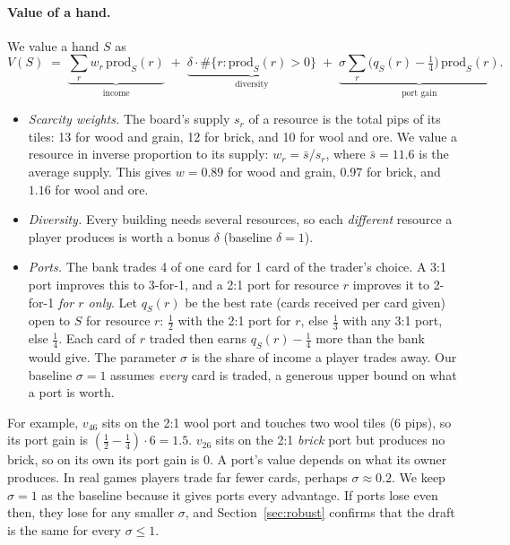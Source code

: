 \documentclass[11pt]{article}
\begin{document}
\paragraph{Value of a hand.} We value a hand $S$ as
\begin{equation}\label{eq:V}
V(S) \;=\; \underbrace{\sum_r w_r\,\mathrm{prod}_S(r)}_{\text{income}} \;+\; \underbrace{\delta\cdot\#\{r:\mathrm{prod}_S(r)>0\}}_{\text{diversity}} \;+\; \underbrace{\sigma\sum_r \big(q_S(r)-\tfrac14\big)\,\mathrm{prod}_S(r)}_{\text{port gain}} .
\end{equation}
\begin{itemize}
\item \emph{Scarcity weights.} The board's supply $s_r$ of a resource is the total pips of its tiles: 13 for wood and grain, 12 for brick, and 10 for wool and ore. We value a resource in inverse proportion to its supply: $w_r=\bar s/s_r$, where $\bar s=11.6$ is the average supply. This gives $w=0.89$ for wood and grain, $0.97$ for brick, and $1.16$ for wool and ore.
\item \emph{Diversity.} Every building needs several resources, so each \emph{different} resource a player produces is worth a bonus $\delta$ (baseline $\delta=1$).
\item \emph{Ports.} The bank trades 4 of one card for 1 card of the trader's choice. A 3:1 port improves this to 3-for-1, and a 2:1 port for resource $r$ improves it to 2-for-1 \emph{for $r$ only}. Let $q_S(r)$ be the best rate (cards received per card given) open to $S$ for resource $r$: $\tfrac12$ with the 2:1 port for $r$, else $\tfrac13$ with any 3:1 port, else $\tfrac14$. Each card of $r$ traded then earns $q_S(r)-\tfrac14$ more than the bank would give. The parameter $\sigma$ is the share of income a player trades away. Our baseline $\sigma=1$ assumes \emph{every} card is traded, a generous upper bound on what a port is worth.
\end{itemize}
For example, $v_{46}$ sits on the 2:1 wool port and touches two wool tiles (6 pips), so its port gain is $(\tfrac12-\tfrac14)\cdot 6 = 1.5$. $v_{26}$ sits on the 2:1 \emph{brick} port but produces no brick, so on its own its port gain is $0$. A port's value depends on what its owner produces. In real games players trade far fewer cards, perhaps $\sigma\approx0.2$. We keep $\sigma=1$ as the baseline because it gives ports every advantage. If ports lose even then, they lose for any smaller $\sigma$, and Section~\ref{sec:robust} confirms that the draft is the same for every $\sigma\le1$.
\end{document}

